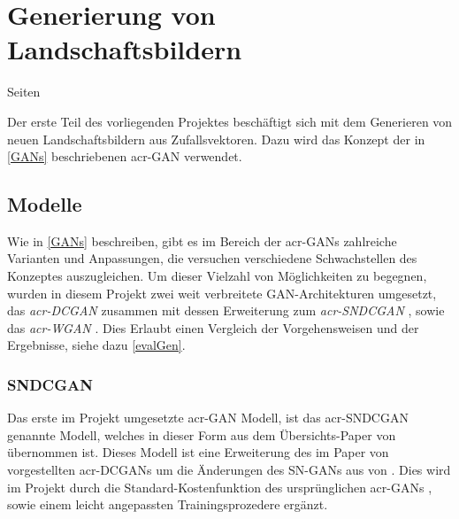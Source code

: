  \chapter{Generierung von Landschaftsbildern}\label{chp:bildgenerierung} %
 Seiten
 \glsresetall

 Der erste Teil des vorliegenden Projektes beschäftigt sich mit dem Generieren
 von neuen Landschaftsbildern aus Zufallsvektoren. Dazu wird das Konzept der in
 \cref{GANs} beschriebenen \gls{acr-GAN} verwendet.
 
 \section{Modelle}%

 Wie in \cref{GANs} beschreiben, gibt es im Bereich der \gls{acr-GAN}s
 zahlreiche Varianten und Anpassungen, die versuchen verschiedene Schwachstellen
 des Konzeptes auszugleichen. Um dieser Vielzahl von Möglichkeiten zu begegnen,
 wurden in diesem Projekt zwei weit verbreitete \cite[S. 3]{kurach2018gan}
 GAN-Architekturen umgesetzt, das \emph{\gls{acr-DCGAN}}
 \cite{radford2015unsupervised} zusammen mit dessen Erweiterung zum
 \emph{\gls{acr-SNDCGAN}} \cite{miyato2018spectral}, sowie das
 \emph{\gls{acr-WGAN}} \cite{arjovsky2017wasserstein}. Dies Erlaubt einen
 Vergleich der Vorgehensweisen und der Ergebnisse, siehe dazu \cref{evalGen}.
 
\subsection{SNDCGAN} %
\label{sub:sndcgan}

Das erste im Projekt umgesetzte \gls{acr-GAN} Modell, ist das \gls{acr-SNDCGAN}
genannte Modell, welches in dieser Form aus dem Übersichts-Paper
 von \citeauthor{kurach2018gan} \cite{kurach2018gan}
übernommen ist. Dieses Modell ist eine Erweiterung des im Paper
 von \citeauthor{radford2015unsupervised}
\cite{radford2015unsupervised} vorgestellten \gls{acr-DCGAN}s um die Änderungen
des SN-GANs aus  von
\citeauthor{miyato2018spectral} \cite{miyato2018spectral}. Dies wird im Projekt
durch die Standard-Kostenfunktion des ursprünglichen \gls{acr-GAN}s
\cite{goodfellow2014generative}, sowie einem leicht angepassten
Trainingsprozedere ergänzt.

